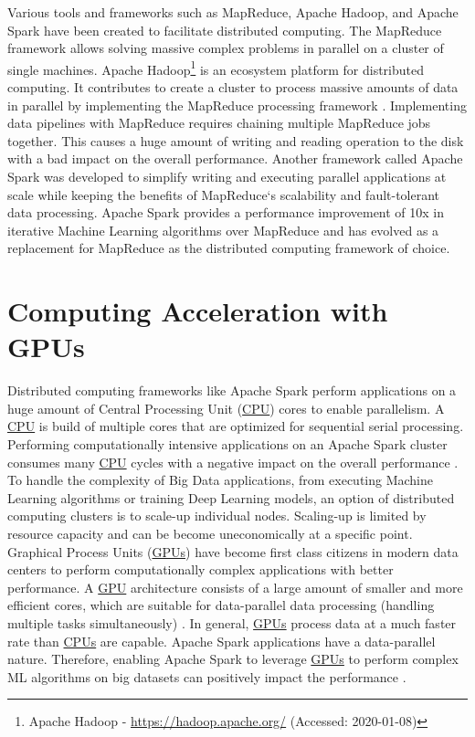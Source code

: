 Various tools and frameworks such as MapReduce, Apache Hadoop, and Apache Spark have been created to facilitate distributed computing.
The MapReduce\cite{Dean2004MapReduce} framework allows solving massive complex problems in parallel on a cluster of single machines.
Apache Hadoop\footnote{Apache Hadoop - \url{https://hadoop.apache.org/} (Accessed: 2020-01-08)} is an ecosystem platform for distributed computing. It contributes to create a cluster to process massive amounts of data in parallel by implementing the MapReduce processing framework \cite{Khattak2016BigData}.
Implementing data pipelines with MapReduce requires chaining multiple MapReduce jobs together. This causes a huge amount of writing and reading operation to the disk with a bad impact on the overall performance. Another framework called Apache Spark was developed to simplify writing and executing parallel applications at scale while keeping the benefits of MapReduce`s scalability and fault-tolerant data processing. Apache Spark provides a performance improvement of 10x in iterative Machine Learning algorithms over MapReduce \cite{Zaharia2010Spark} and has evolved as a replacement for MapReduce as the distributed computing framework of choice.


\section{Computing Acceleration with GPUs}
Distributed computing frameworks like Apache Spark perform applications on a huge amount of Central Processing Unit (\hyperlink{abbr:cpu}{CPU}) cores to enable parallelism. A \hyperlink{abbr:cpu}{CPU} is build of multiple cores that are optimized for sequential serial processing. Performing computationally intensive applications on an Apache Spark cluster consumes many \hyperlink{abbr:cpu}{CPU} cycles with a negative impact on the overall performance \cite{Li2015HeteroSpark}.
To handle the complexity of Big Data applications, from executing Machine Learning algorithms or training Deep Learning models, an option of distributed computing clusters is to scale-up individual nodes. Scaling-up is limited by resource capacity and can be become uneconomically at a specific point.
Graphical Process Units (\hyperlink{abbr:gpu}{GPUs}) have become first class citizens in modern data centers to perform computationally complex applications with better performance. A \hyperlink{abbr:gpu}{GPU} architecture consists of a large amount of smaller and more efficient cores, which are suitable for data-parallel data processing (handling multiple tasks simultaneously) \cite{Yuan2016SparkGPU}. In general, \hyperlink{abbr:gpu}{GPUs} process data at a much faster rate than \hyperlink{abbr:cpu}{CPUs} are capable.
Apache Spark applications have a data-parallel nature. Therefore, enabling Apache Spark to leverage \hyperlink{abbr:gpu}{GPUs} to perform complex ML algorithms on big datasets can positively impact the performance \cite{Yuan2016SparkGPU}.


